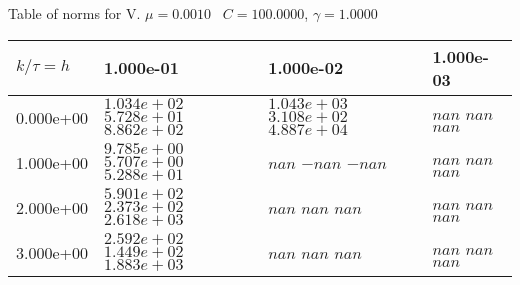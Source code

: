 \begin{center}
Table of norms for V. $\mu = 0.0010$ \, $C = 100.0000$, $\gamma = 1.0000$
  
\begin{tabular}{|p{1in}|p{1in}|p{1in}|p{1in}|} \hline
$k / \tau = h$ &1.000e-01 &1.000e-02 &1.000e-03 \\ \hline 
0.000e+00 & $1.034e+02$  $5.728e+01$  $8.862e+02$  & $1.043e+03$  $3.108e+02$  $4.887e+04$  & $nan$  $nan$  $nan$  \\ \hline 
1.000e+00 & $9.785e+00$  $5.707e+00$  $5.288e+01$  & $nan$  $-nan$  $-nan$  & $nan$  $nan$  $nan$  \\ \hline 
2.000e+00 & $5.901e+02$  $2.373e+02$  $2.618e+03$  & $nan$  $nan$  $nan$  & $nan$  $nan$  $nan$  \\ \hline 
3.000e+00 & $2.592e+02$  $1.449e+02$  $1.883e+03$  & $nan$  $nan$  $nan$  & $nan$  $nan$  $nan$  \\ \hline 

\end{tabular}\\[20pt]
\end{center}
